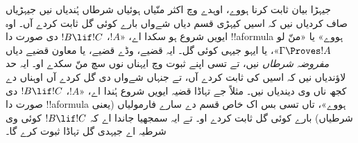 \documentclass[../../../include/open-logic-section]{subfiles}
\begin{document}
جیہڑا بیان ثابت کرنا ہووے، اوہدے وچ اکثر منّیاں ہوئیاں شرطاں ہُندیاں نیں جیہڑیاں صاف کردیاں نیں کہ اسیں کیہڑی قسم دیاں شےواں بارے کوئی گل ثابت کردے آں۔ اوہ ایویں شروع ہو سکدا اے، «$!A$، $!B \lif !C$ دی صورت دا !!a{formula} ہووے» یا «منّ لو $\Gamma \Proves !A$»، یا ایہو جیہی کوئی گل۔ ایہ قضیے، وڈے قضیے، یا معاون قضیے دیاں \emph{مفروضہ شرطاں} نیں، تے تسی اپنے ثبوت وچ ایہناں نوں سچ منّ سکدے او۔ ایہ حد لاؤندیاں نیں کہ اسیں کی ثابت کردے آں، تے جنہاں شےواں دی گل کردے آں اوہناں دے کجھ ناں وی دیندیاں نیں۔ مثلاً جے تہاڈا قضیہ ایویں شروع ہُندا اے، «$!A$، $!B \lif !C$ دی صورت دا !!a{formula} ہووے»، تاں تسی بس اک خاص قسم دے سارے فارمولیاں (یعنی شرطیاں) بارے کوئی گل ثابت کردے او۔ تے ایہ سمجھیا جاندا اے کہ $!B \lif !C$ کوئی وی شرطیہ اے جیہدی گل تہاڈا ثبوت کرے گا۔
\end{document}
